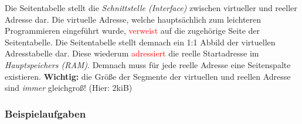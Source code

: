 \documentclass[12pt,a4paper]{article}
\begin{document}
\noindent Die Seitentabelle stellt die \textit{Schnittstelle (Interface)} zwischen virtueller und reeller Adresse dar. Die virtuelle Adresse, welche hauptsächlich zum leichteren Programmieren eingeführt wurde, \textcolor{red}{verweist} auf die zugehörige Seite der Seitentabelle. Die Seitentabelle stellt demnach ein 1:1 Abbild der virtuellen Adresstabelle dar. Diese wiederum \textcolor{red}{adressiert} die reelle Startadresse im \textit{Hauptspeichers (RAM)}. Demnach muss für jede reelle Adresse eine Seitenspalte existieren. \newline
\textbf{Wichtig:} die Größe der Segmente der virtuellen und reellen Adresse sind \textit{immer} gleichgroß! (Hier: 2kiB)
\subsubsection{Beispielaufgaben}
\end{document}

